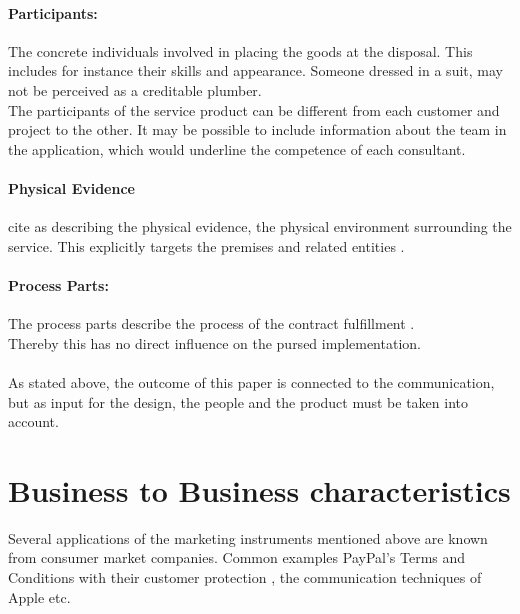 \paragraph{Participants:}The concrete individuals involved in placing the goods at the disposal. This includes for instance their skills and appearance. Someone dressed in a suit, may not be perceived as a creditable plumber. \\ 
The participants of the service product can be different from each customer and project to the other. It may be possible to include information about the team in the application, which would underline the competence of each consultant.
\paragraph{Physical Evidence}
\textcite[155]{AzilaGbettor.2013} cite \textcite{booms1981marketing} as describing the physical evidence, the physical environment surrounding the service. This explicitly targets the premises and related entities \parencite[see.]{Hoepner.2015}.
\paragraph{Process Parts:}
The process parts describe the process of the contract fulfillment \parencite{Hoepner2015}.\\
Thereby this has no direct influence on the pursed implementation. 
\paragraph*{} As stated above, the outcome of this paper is connected to the communication, but as input for the design, the people and the product must be taken into account. 
\section{Business to Business characteristics}
Several applications of the marketing instruments mentioned above are known from consumer market companies. Common examples PayPal's Terms and Conditions with their customer protection \parencite[see][]{PayPal}, the communication techniques of Apple etc.
